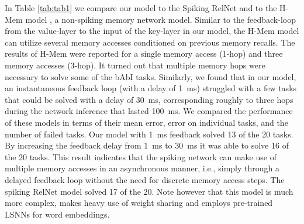 \documentclass{article}
\begin{document}
In Table \ref{tab:tab1} we compare our model to the Spiking RelNet \cite{plank2021long} and to the H-Mem model \cite{limbacher2020hmem}, a non-spiking memory network model. Similar to the feedback-loop from the value-layer to the input of the key-layer in our model, the H-Mem model can utilize several memory accesses conditioned on previous memory recalls. The results of H-Mem were reported for a single memory access (1-hop) and three memory accesses (3-hop). It turned out that multiple memory hops were necessary to solve some of the bAbI tasks. Similarly, we found that in our model, an instantaneous feedback loop (with a delay  of \SI{1}{\ms}) struggled with a few tasks that could be solved with a delay of \SI{30}{\ms}, corresponding roughly to three hops during the network inference that lasted \SI{100}{\ms}. We compared the performance of these models in terms of their mean error, error on individual tasks, and the number of failed tasks. 
Our model with \SI{1}{\ms} feedback solved \num{13} of the \num{20} tasks. By increasing the feedback delay  from \SI{1}{\ms} to \SI{30}{\ms} it was able to solve \num{16} of the \num{20} tasks. This result indicates that the spiking network can make use of multiple memory accesses in an asynchronous manner, i.e., simply through a delayed feedback loop without the need for discrete memory access steps.  
The spiking RelNet model solved \num{17} of the \num{20}. Note however that this model is much more complex, makes heavy use of weight sharing and employs pre-trained LSNNs for word embeddings.
\end{document}
